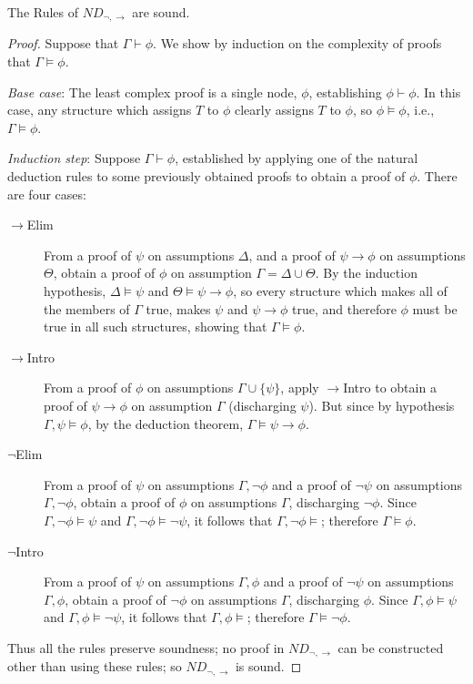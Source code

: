 \begin{theorem} The Rules of $ND_{\neg,\to}$ are sound.
\begin{proof} Suppose that $\Gamma \vdash \phi$. We show by induction on the complexity of proofs that $\Gamma \vDash \phi$.

\emph{Base case}: The least complex proof is a single node, $\phi$, establishing $\phi \vdash \phi$. In this case, any structure which assigns $T$ to $\phi$ clearly assigns $T$ to $\phi$, so $\phi\vDash\phi$, i.e., $\Gamma\vDash\phi$.

\emph{Induction step}: Suppose $\Gamma\vdash\phi$, established by applying one of the natural deduction rules to some previously obtained proofs to obtain a proof of $\phi$. There are four cases: 
 \begin{description}
	\item [$\to$Elim] From a proof of $\psi$ on assumptions $\Delta$, and a proof of $\psi\to\phi$ on assumptions $\Theta$, obtain a proof of $\phi$ on assumption $\Gamma=\Delta\cup\Theta$. By the induction hypothesis, $\Delta \vDash \psi$ and $\Theta \vDash \psi\to\phi$, so every structure which makes all of the members of $\Gamma$ true, makes $\psi$ and $\psi\to\phi$ true, and therefore $\phi$ must be true in all such structures, showing that $\Gamma\vDash\phi$.
	\item [$\to$Intro] From a proof of $\phi$ on assumptions $\Gamma \cup \{\psi\}$, apply $\to$Intro to obtain a proof of $\psi\to\phi$ on assumption $\Gamma$ (discharging $\psi$). But since by hypothesis $\Gamma,\psi \vDash\phi$, by the deduction theorem, $\Gamma \vDash \psi\to\phi$.
	\item [$\neg$Elim] From a proof of $\psi$ on assumptions $\Gamma,\neg\phi$ and a proof of $\neg\psi$ on assumptions $\Gamma,\neg\phi$, obtain a proof of $\phi$ on assumptions $\Gamma$, discharging $\neg\phi$. Since $\Gamma,\neg\phi \vDash \psi$ and $\Gamma,\neg\phi\vDash\neg\psi$, it follows that $\Gamma,\neg\phi\vDash$; therefore $\Gamma\vDash\phi$.
		\item [$\neg$Intro] From a proof of $\psi$ on assumptions $\Gamma,\phi$ and a proof of $\neg\psi$ on assumptions $\Gamma,\phi$, obtain a proof of $\neg\phi$ on assumptions $\Gamma$, discharging $\phi$. Since $\Gamma,\phi \vDash \psi$ and $\Gamma,\phi\vDash\neg\psi$, it follows that $\Gamma,\phi\vDash$; therefore $\Gamma\vDash\neg\phi$.
\end{description}
Thus all the rules preserve soundness; no proof in $ND_{\neg,\to}$ can be constructed other than using these rules; so $ND_{\neg,\to}$ is sound. \end{proof}\end{theorem}




